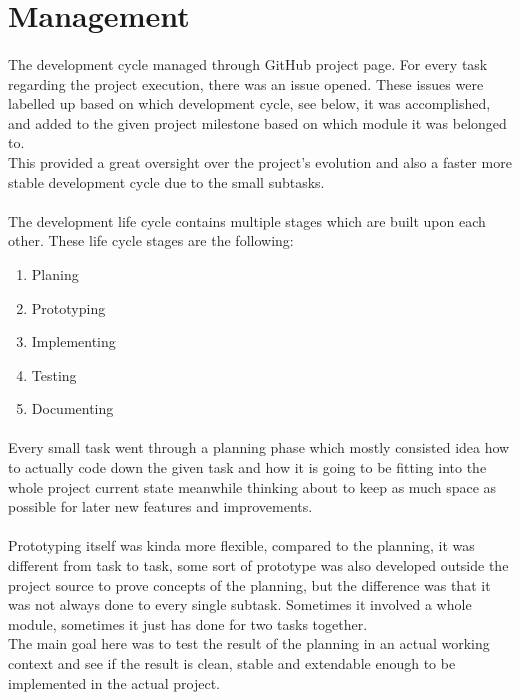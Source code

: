 \documentclass[]{report}
\begin{document}
\section{Management}

\paragraph{ }
The development cycle managed through GitHub project page. For every task regarding the project execution, there was an issue opened. These issues were labelled up based on which development cycle, see below, it was accomplished, and added to the given project milestone based on which module it was belonged to.
\\
This provided a great oversight over the project's evolution and also a faster more stable development cycle due to the small subtasks.

\paragraph{ }
The development life cycle contains multiple stages which are built upon each other. These life cycle stages are the following:

\begin{enumerate}
	\item Planing
	\item Prototyping
	\item Implementing
	\item Testing
	\item Documenting
\end{enumerate}

\paragraph{ }
Every small task went through a planning phase which mostly consisted idea how to actually code down the given task and how it is going to be fitting into the whole project current state meanwhile thinking about to keep as much space as possible for later new features and improvements.

\paragraph{ }
Prototyping itself was kinda more flexible, compared to the planning, it was different from task to task, some sort of prototype was also developed outside the project source to prove concepts of the planning, but the difference was that it was not always done to every single subtask. Sometimes it involved a whole module, sometimes it just has done for two tasks together.
\\
The main goal here was to test the result of the planning in an actual working context and see if the result is clean, stable and extendable enough to be implemented in the actual project.
\end{document}
